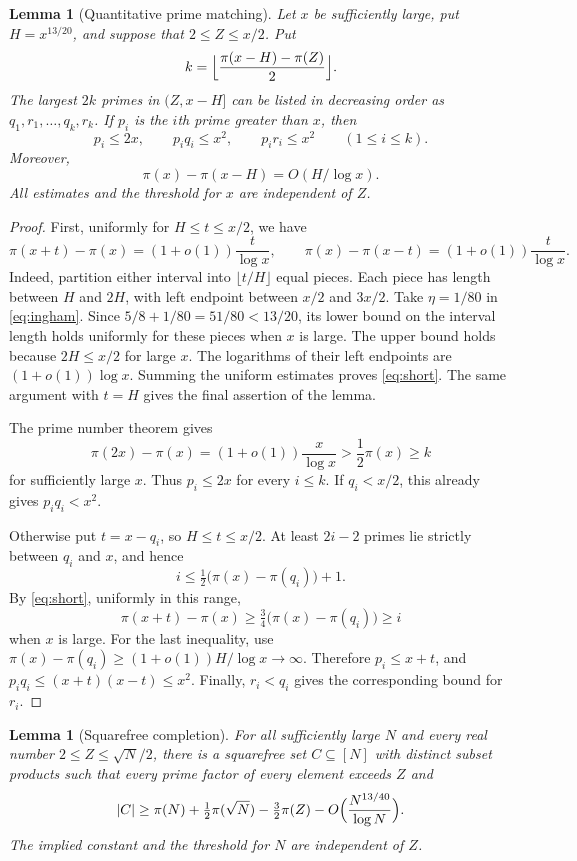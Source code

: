 \documentclass[11pt]{article}
\numberwithin{equation}{section}
\newtheorem{lemma}[theorem]{Lemma}
\theoremstyle{remark}
\begin{document}
\begin{lemma}[Quantitative prime matching]\label{lem:match}
Let $x$ be sufficiently large, put $H=x^{13/20}$, and suppose that $2\le Z\le x/2$. Put
\[
k=\Bigl\lfloor\frac{\pi(x-H)-\pi(Z)}2\Bigr\rfloor.
\]
The largest $2k$ primes in $(Z,x-H]$ can be listed in decreasing order as $q_1,r_1,\dots,q_k,r_k$. If $p_i$ is the $i$th prime greater than $x$, then
\[
p_i\le2x,\qquad p_iq_i\le x^2,\qquad p_ir_i\le x^2\qquad(1\le i\le k).
\]
Moreover,
\[
\pi(x)-\pi(x-H)=O(H/\log x).
\]
All estimates and the threshold for $x$ are independent of $Z$.
\end{lemma}

\begin{proof}
First, uniformly for $H\le t\le x/2$, we have
\begin{equation}\label{eq:short}
\pi(x+t)-\pi(x)=(1+o(1))\frac t{\log x},\qquad\pi(x)-\pi(x-t)=(1+o(1))\frac t{\log x}.
\end{equation}
Indeed, partition either interval into $\lfloor t/H\rfloor$ equal pieces. Each piece has length between $H$ and $2H$, with left endpoint between $x/2$ and $3x/2$. Take $\eta=1/80$ in \eqref{eq:ingham}. Since $5/8+1/80=51/80<13/20$, its lower bound on the interval length holds uniformly for these pieces when $x$ is large. The upper bound holds because $2H\le x/2$ for large $x$. The logarithms of their left endpoints are $(1+o(1))\log x$. Summing the uniform estimates proves \eqref{eq:short}. The same argument with $t=H$ gives the final assertion of the lemma.

The prime number theorem gives
\[
\pi(2x)-\pi(x)=(1+o(1))\frac x{\log x}>\frac12\pi(x)\ge k
\]
for sufficiently large $x$. Thus $p_i\le2x$ for every $i\le k$. If $q_i<x/2$, this already gives $p_iq_i<x^2$.

Otherwise put $t=x-q_i$, so $H\le t\le x/2$. At least $2i-2$ primes lie strictly between $q_i$ and $x$, and hence
\[
i\le\tfrac12\bigl(\pi(x)-\pi(q_i)\bigr)+1.
\]
By \eqref{eq:short}, uniformly in this range,
\[
\pi(x+t)-\pi(x)\ge\tfrac34\bigl(\pi(x)-\pi(q_i)\bigr)\ge i
\]
when $x$ is large. For the last inequality, use $\pi(x)-\pi(q_i)\ge(1+o(1))H/\log x\to\infty$. Therefore $p_i\le x+t$, and $p_iq_i\le(x+t)(x-t)\le x^2$. Finally, $r_i<q_i$ gives the corresponding bound for $r_i$.
\end{proof}

\begin{lemma}[Squarefree completion]\label{lem:completion}
For all sufficiently large $N$ and every real number $2\le Z\le\sqrt N/2$, there is a squarefree set $C\subseteq[N]$ with distinct subset products such that every prime factor of every element exceeds $Z$ and
\[
|C|\ge\pi(N)+\tfrac12\pi(\sqrt N)-\tfrac32\pi(Z)-O\Bigl(\frac{N^{13/40}}{\log N}\Bigr).
\]
The implied constant and the threshold for $N$ are independent of $Z$.
\end{lemma}
\end{document}
